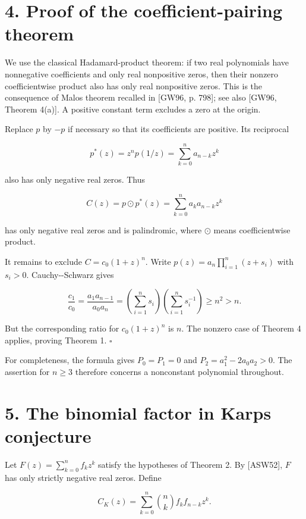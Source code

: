 \documentclass[11pt]{article}
\begin{document}
\section{4. Proof of the coefficient-pairing
theorem}\label{proof-of-the-coefficient-pairing-theorem}

We use the classical Hadamard-product theorem: if two real polynomials
have nonnegative coefficients and only real nonpositive zeros, then
their nonzero coefficientwise product also has only real nonpositive
zeros. This is the consequence of Malo\textquotesingle s theorem
recalled in {[}GW96, p. 798{]}; see also {[}GW96, Theorem 4(a){]}. A
positive constant term excludes a zero at the origin.

Replace \(p\) by \(-p\) if necessary so that its coefficients are
positive. Its reciprocal

\[
p^*(z)=z^np(1/z)=\sum_{k=0}^n a_{n-k}z^k
\]

also has only negative real zeros. Thus

\[
C(z)=p\odot p^*(z)=\sum_{k=0}^n a_ka_{n-k}z^k
\]

has only negative real zeros and is palindromic, where \(\odot\) means
coefficientwise product.

It remains to exclude \(C=c_0(1+z)^n\). Write
\(p(z)=a_n\prod_{i=1}^n(z+s_i)\) with \(s_i>0\). Cauchy-\/-Schwarz gives

\[
\frac{c_1}{c_0}
=\frac{a_1a_{n-1}}{a_0a_n}
=\left(\sum_{i=1}^n s_i\right)
 \left(\sum_{i=1}^n s_i^{-1}\right)
\ge n^2>n.
\tag{15}
\]

But the corresponding ratio for \(c_0(1+z)^n\) is \(n\). The nonzero
case of Theorem 4 applies, proving Theorem 1. \(\square\)

For completeness, the formula gives \(P_0=P_1=0\) and
\(P_2=a_1^2-2a_0a_2>0\). The assertion for \(n\ge3\) therefore concerns
a nonconstant polynomial throughout.

\section{5. The binomial factor in Karp\textquotesingle s
conjecture}\label{the-binomial-factor-in-karps-conjecture}

Let \(F(z)=\sum_{k=0}^n f_kz^k\) satisfy the hypotheses of Theorem 2. By
{[}ASW52{]}, \(F\) has only strictly negative real zeros. Define

\[
C_K(z)=\sum_{k=0}^n\binom nk f_kf_{n-k}z^k.
\]
\end{document}
